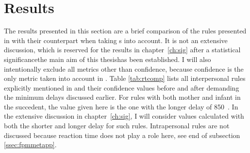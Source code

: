 \section{Results}
\label{sec:fpmres}
The results presented in this section are a brief comparison of the rules presented in \citet{rohlfing_multimodal_underreview} with their counterpart when taking \rt s into account.
It is not an extensive discussion, which is reserved for the results in chapter~\ref{ch:sig} after a statistical significance\dash the main aim of this thesis\dash has been established.
I will also intentionally exclude all metrics other than confidence, because confidence is the only metric taken into account in \citet{rohlfing_multimodal_underreview}.
Table \ref{tab:rtcomp} lists all interpersonal rules explicitly mentioned in \citet{rohlfing_multimodal_underreview} and their confidence values before and after demanding the minimum delays discussed earlier.
For rules with both mother and infant in the succedent, the value given here is the one with the longer delay of 850~\ms.
In the extensive discussion in chapter~\ref{ch:sig}, I will consider values calculated with both the shorter and longer delay for such rules.
Intrapersonal rules are not discussed because reaction time does not play a role here, see end of subsection \ref{ssec:fpmmetapp}.

